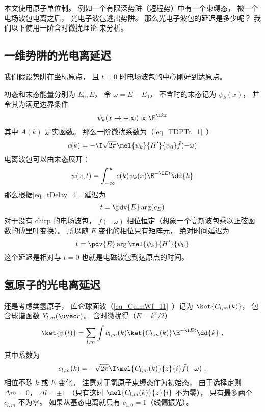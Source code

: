 
\begin{issues}
\issueDraft
\end{issues}


本文使用原子单位制。 例如一个有限深势阱（短程势）中有一个束缚态， 被一个电场波包电离之后， 光电子波包逃出势阱。 那么光电子波包的延迟是多少呢？ 我们以下使用一阶含时微扰理论 来分析。

\subsection{一维势阱的光电离延迟}
我们假设势阱在坐标原点， 且 $t = 0$ 时电场波包的中心刚好到达原点。

初态和末态能量分别为 $E_0, E$， 令 $\omega = E - E_0$， 不含时的末态记为 $\psi_k(x)$， 并令其为满足边界条件
\begin{equation}\label{eq_HeAna2_2}
\psi_k(x \to +\infty) \propto \E^{\I kx}
\end{equation}
其中 $A(k)$ 是实函数。 那么一阶微扰系数为（\autoref{eq_TDPTc_1}~）
\begin{equation}
c(k) = -\I \sqrt{2\pi} \mel{\psi_k}{H'}{\psi_0} \tilde f(-\omega)
\end{equation}
电离波包可以由末态展开：
\begin{equation}
\psi(x, t) = \int_{-\infty}^{\infty} c(k) \psi_k(x)\E^{-\I E t} \dd{k}
\end{equation}
那么根据\autoref{eq_tDelay_4}~ 延迟为
\begin{equation}\label{eq_HeAna2_3}
t = \pdv{E} \arg (c_E)
\end{equation}
对于没有 chirp 的电场波包， $\tilde f(-\omega)$ 相位恒定（想象一个高斯波包乘以正弦函数的傅里叶变换）。 所以随 $E$ 变化的相位只有矩阵元， 绝对时间延迟为
\begin{equation}\label{eq_HeAna2_1}
t = \pdv{E} \arg \mel{\psi_k}{H'}{\psi_0}
\end{equation}
这个延迟是相对与 $t = 0$ 也就是电磁波包到达原点的时间。

\subsection{氢原子的光电离延迟}\label{sub_HeAna2_1}
还是考虑类氢原子， 库仑球面波（\autoref{eq_CulmWf_11}~）记为 $\ket{C_{l,m}(k)}$， 包含球谐函数 $Y_{l,m}(\uvec r)$。 含时微扰得（$E = k^2/2$）
\begin{equation}\label{eq_HeAna2_4}
\ket{\psi(t)} = \sum_{l,m} \int c_{l,m}(k) \ket{C_{l,m}(k)} \E^{-\I E t} \dd{k}~,
\end{equation}
其中系数为
\begin{equation}
c_{l,m}(k) = -\sqrt{2\pi}\I \mel{C_{l,m}(k)}{z}{i} \tilde f(-\omega)~.
\end{equation}
相位不随 $k$ 或 $E$ 变化。 注意对于氢原子束缚态作为初始态， 由于选择定则 $\Delta m = 0$， $\Delta l = \pm 1$ （只有这时 $\mel{C_{l,m}(k)}{z}{i}$ 不为零）， 只有最多两个 $c_{l,m}$ 不为零。 如果从基态电离就只有 $c_{1,0} = 1$（线偏振光）。

